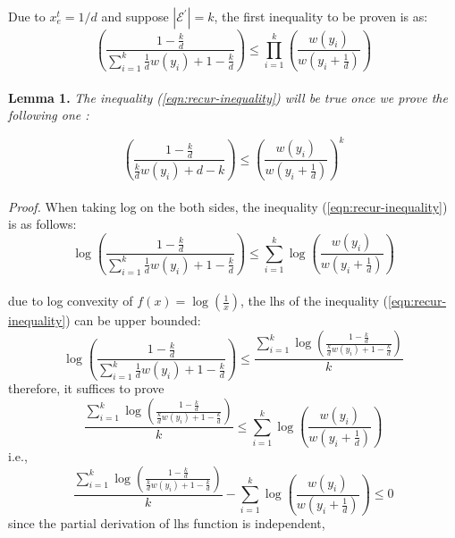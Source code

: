 \documentclass{article}
\begin{document}
Due to $x_e^t =  1/d$ and suppose $|\mathcal{E}^{\prime}| = k$,  the first inequality to be proven is as:
\begin{equation}
\label{eqn:recur-inequality}
\left(\frac{1-\frac{k}{d}}{\sum_{i=1}^{k} \frac{1}{d} w\left(y_{i}\right)+1-\frac{k}{d}}\right)
\leq
\prod_{i=1}^{k}  \left(\frac{w\left(y_{i}\right)}{w\left(y_{i}+\frac{1}{d}\right)}\right)
\end{equation}
\\
\textbf{Lemma 1.}
\textit{The inequality (\ref{eqn:recur-inequality}) will be true once we prove the following one :} 

\begin{equation*}
    \left(\frac{1 - \frac{k}{d}}{ \frac{k}{d} w\left(y_{i}\right)+d - k}\right)
    \leq 
    \left(\frac{w\left(y_{i}\right)}{w\left(y_{i}+\frac{1}{d}\right)}\right)^{k}
\end{equation*}
\\
\textit{Proof.} 
When taking log on the both sides, the inequality (\ref{eqn:recur-inequality}) is as follows:
\begin{equation*}
\log \left(\frac{1-\frac{k}{d}}{\sum_{i=1}^{k} \frac{1}{d} w\left(y_{i}\right)+1-\frac{k}{d}}\right)
\leq
\sum_{i=1}^{k} \log \left(\frac{w\left(y_{i}\right)}{w\left(y_{i}+\frac{1}{d}\right)}\right)
\end{equation*}
\\
due to log convexity of $f(x) = \log(\frac{1}{x})$, the lhs of the inequality (\ref{eqn:recur-inequality}) can be upper bounded:
\begin{equation*}
\log \left(\frac{1-\frac{k}{d}}{\sum_{i=1}^{k} \frac{1}{d} w\left(y_{i}\right)+1-\frac{k}{d}}\right)
\leq 
\frac{\sum^{k}_{i=1}\log \left(\frac{1-\frac{k}{d}}{ \frac{k}{d} w\left(y_{i}\right)+1-\frac{k}{d}}\right)}{k}
\end{equation*}
therefore, it suffices to prove 
\begin{equation*}
\frac{\sum^{k}_{i=1}\log \left(\frac{1-\frac{k}{d}}{ \frac{k}{d} w\left(y_{i}\right)+1-\frac{k}{d}}\right)}{k}
\leq 
\sum_{i=1}^{k} \log \left(\frac{w\left(y_{i}\right)}{w\left(y_{i}+\frac{1}{d}\right)}\right)
\end{equation*}
i.e., 
\begin{equation*}
\frac{\sum^{k}_{i=1}\log \left(\frac{1-\frac{k}{d}}{ \frac{k}{d} w\left(y_{i}\right)+1-\frac{k}{d}}\right)}{k}
-
\sum_{i=1}^{k} \log \left(\frac{w\left(y_{i}\right)}{w\left(y_{i}+\frac{1}{d}\right)}\right)
\leq 
0
\end{equation*}
since the partial derivation of lhs function is independent,
\end{document}
